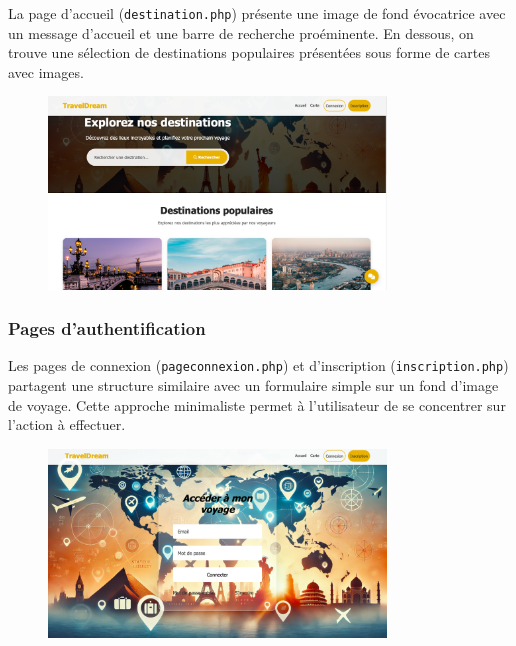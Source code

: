 \documentclass[a4paper,12pt]{article}
\begin{document}
La page d'accueil (\texttt{destination.php}) présente une image de fond évocatrice avec un message d'accueil et une barre de recherche proéminente. En dessous, on trouve une sélection de destinations populaires présentées sous forme de cartes avec images.
\begin{figure}[H]
    \centering
    \includegraphics[width=0.8\textwidth]{Destination.png}
\end{figure}

\vspace{0.5cm}
\subsubsection{Pages d'authentification}
Les pages de connexion (\texttt{pageconnexion.php}) et d'inscription (\texttt{inscription.php}) partagent une structure similaire avec un formulaire simple sur un fond d'image de voyage. Cette approche minimaliste permet à l'utilisateur de se concentrer sur l'action à effectuer.
\begin{figure}[H]
    \centering
    \includegraphics[width=0.8\textwidth]{accueil.png}
\end{figure}
\end{document}
